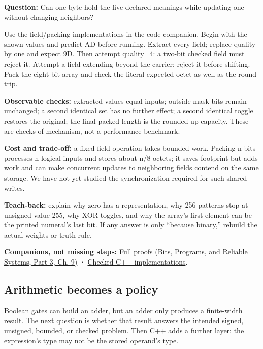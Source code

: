 \hypertarget{01-foundations-i-ch001-test-the-packed-meaning}{}

\textbf{Question:} Can one byte hold the five declared meanings while updating one without changing neighbors?

Use the field/packing implementations in the code companion. Begin with the shown values and predict AD before running. Extract every field; replace quality by one and expect 9D. Then attempt quality=4: a two-bit checked field must reject it. Attempt a field extending beyond the carrier: reject it before shifting. Pack the eight-bit array and check the literal expected octet as well as the round trip.

\textbf{Observable checks:} extracted values equal inputs; outside-mask bits remain unchanged; a second identical set has no further effect; a second identical toggle restores the original; the final packed length is the rounded-up capacity. These are checks of mechanism, not a performance benchmark.

\textbf{Cost and trade-off:} a fixed field operation takes bounded work. Packing n bits processes n logical inputs and stores about n/8 octets; it saves footprint but adds work and can make concurrent updates to neighboring fields contend on the same storage. We have not yet studied the synchronization required for such shared writes.

\textbf{Teach-back:} explain why zero has a representation, why 256 patterns stop at unsigned value 255, why XOR toggles, and why the array's first element can be the printed numeral's last bit. If any answer is only ``because binary,'' rebuild the actual weights or truth rule.

\textbf{Companions, not missing steps:} \href{../01-Bits-Programs-and-Reliable-Systems-P03/main.pdf\#01-foundations-i-ch011-m001---positional-value-masks-fields-and-de-morgan}{Full proofs (Bits, Programs, and Reliable Systems, Part 3, Ch. 9)} · \hyperref[appendix-4e2236f53445-m001---width-safe-fields-and-lsb-first-bit-packing]{Checked C++ implementations}.

\subsection{Arithmetic becomes a policy}\label{01-foundations-i-ch001-arithmetic-becomes-a-policy}

\hypertarget{01-foundations-i-ch001-arithmetic-becomes-a-policy}{}

Boolean gates can build an adder, but an adder only produces a finite-width result. The next question is whether that result answers the intended signed, unsigned, bounded, or checked problem. Then C++ adds a further layer: the expression's type may not be the stored operand's type.

